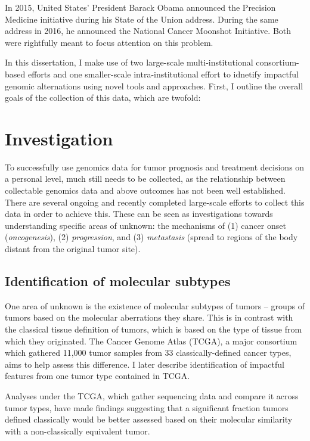 In 2015, United States’ President Barack Obama announced the Precision
Medicine initiative during his State of the Union address. During the
same address in 2016, he announced the National Cancer Moonshot
Initiative. Both were rightfully meant to focus attention on this
problem.

In this dissertation, I make use of two large-scale
multi-institutional consortium-based efforts and one smaller-scale
intra-institutional effort to idnetify impactful genomic alternations
using novel tools and approaches. First, I outline the overall goals
of the collection of this data, which are twofold:


\section{Investigation}
	To successfully use genomics data for tumor prognosis and treatment
        decisions on a personal level, much still needs to be
       collected, as the relationship between collectable genomics data and 
       above outcomes has not been well established. There  are several ongoing and recently completed large-scale efforts to collect this data in order to achieve this. These can be
        seen as investigations towards understanding specific areas of
        unknown: the mechanisms of (1) cancer onset (\textit{oncogenesis}),
        (2) \textit{progression}, and (3) \textit{metastasis} (spread to regions of
        the body distant from the original tumor site).


        \subsection{Identification of molecular subtypes}

	One area of unknown is the existence of molecular subtypes of
        tumors – groups of tumors based on the molecular aberrations
        they share. This is in contrast with the classical tissue
        definition of tumors, which is based on the type of tissue
        from which they originated. The Cancer Genome Atlas (TCGA)\cite{mclendon_comprehensive_2008}, a
        major consortium which gathered 11,000 tumor samples from 33
        classically-defined cancer types, aims to help assess this
        difference. I later describe identification of impactful
        features from one tumor type contained in TCGA. 
        
        Analyses under the TCGA, which gather sequencing data and compare it
        across tumor types, have made findings suggesting that
        a significant fraction tumors defined classically would be
        better assessed based on their molecular similarity with a
        non-classically equivalent tumor.

